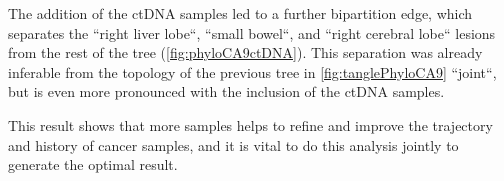 The addition of the ctDNA samples led to a further bipartition edge, which separates the ``right liver lobe``, ``small bowel``, and ``right cerebral lobe`` lesions from the rest of the tree (\autoref{fig:phyloCA9ctDNA}). This separation was already inferable from the topology of the previous tree in \autoref{fig:tanglePhyloCA9} ``joint``, but is even more pronounced with the inclusion of the ctDNA samples.

This result shows that  more samples helps to refine and improve the trajectory and history of cancer samples, and it is vital to do this analysis jointly to generate the optimal result.